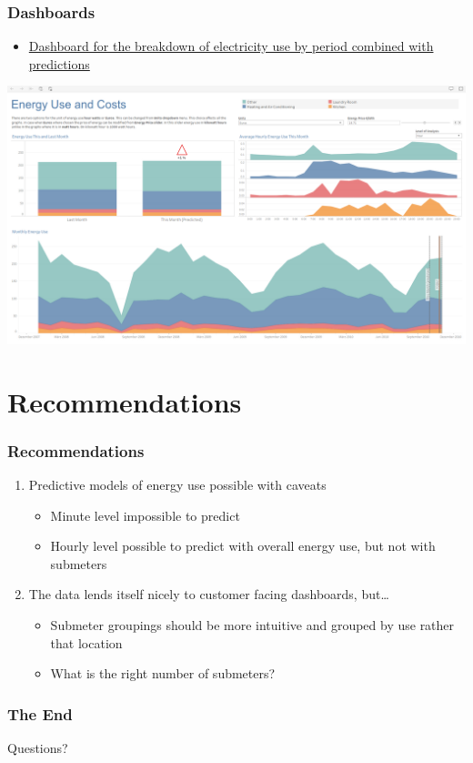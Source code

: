 \documentclass[10pt]{beamer}
\begin{document}
\begin{frame}
\frametitle{Dashboards}

\begin{itemize}
    \item
        \href{https://eu-west-1a.online.tableau.com/\#/site/tuomokareoja/views/EnergyUseandCosts/EnergyUseandCosts/}{Dashboard for the breakdown of electricity use by period combined with predictions}
\end{itemize}

{
    \centering
        \includegraphics[width=\textwidth,height=\textheight,keepaspectratio]{tableau_demo.png}
    \par
}

\end{frame}


\section{Recommendations}


\begin{frame}
\frametitle{Recommendations}

\begin{enumerate}
    \item Predictive models of energy use possible with caveats
    \begin{itemize}
        \pause
        \item Minute level impossible to predict
        \pause
        \item Hourly level possible to predict with overall energy use, but not with submeters
    \end{itemize}
        \pause
    \item The data lends itself nicely to customer facing dashboards, but\ldots
    \begin{itemize}
        \pause
        \item Submeter groupings should be more intuitive and grouped by use rather that location
        \pause
        \item What is the right number of submeters?
    \end{itemize}
\end{enumerate}

\end{frame}

\begin{frame}
\frametitle{The End}

\LARGE{\centerline{Questions?}}

\end{frame}

\end{document}
